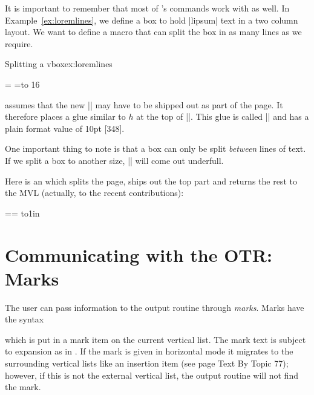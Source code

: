\begin{macro}{\loremlines}
It is important to remember that most of \tex's commands work with \latex as well. In Example~\ref{ex:loremlines}, we define a box to hold |lipsum| text in a two column layout. We want to define a macro that can split the box in as many lines as we require. 
\end{macro}

\begin{texexample}{Splitting a vbox}{ex:loremlines}
\newbox\one
\newbox\two
\long\gdef\loremlines#1#2{%
   \setbox\one=\vbox {#2}
   \setbox\two=\vsplit\one to #1\baselineskip
   \unvbox\two
   \gdef\boxone{#2}
}
\begin{multicols}{2}
\small
\loremlines{16}{\lipsum[1-2]}
\end{multicols}
\boxone
\end{texexample}


\tex assumes that the new || may have to
be shipped out as part of the page. It therefore
places a glue similar to $h$ at the top of ||.
This glue is called |\splittopskip| and has a plain
format value of 10pt [348].

One important thing to note is that a box can only be split \textit{between} lines of text. 
If we split a box to another size, || will come out underfull.

Here is an \otr which splits the page, ships
out the top part and returns the rest to the MVL
(actually, to the recent contributions):

\begin{teXXX}
\output={= to1in
\shipout{} }
\end{teXXX}






\section{Communicating with the OTR: Marks}


The user can pass information to the output routine through \textit{marks}. Marks have the syntax

\begin{teX}
\end{teX}

which is put in a mark item on the current vertical list. The mark text is subject to expansion
as in .
If the mark is given in horizontal mode it migrates to the surrounding vertical lists like an
insertion item (see page Text By Topic 77); however, if this is not the external vertical list, the output routine
will not find the mark.

